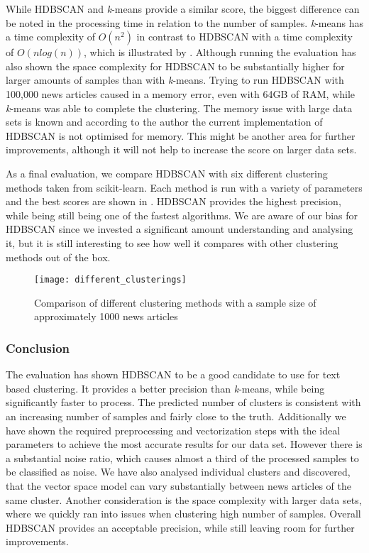 While HDBSCAN and \textit{k}-means provide a similar score,
the biggest difference can be noted in the processing time in relation to the number of samples.
\textit{k}-means has a time complexity of $O(n^2)$ in contrast to HDBSCAN with a time complexity of $O(nlog(n))$,
which is illustrated by .
Although running the evaluation has also shown the space complexity for HDBSCAN
to be substantially higher for larger amounts of samples than with \textit{k}-means.
Trying to run HDBSCAN with 100,000 news articles caused in a memory error,
even with 64GB of RAM, while \textit{k}-means was able to complete the clustering.
The memory issue with large data sets is known and according to the author the current implementation of HDBSCAN
is not optimised for memory\cite{hdbscan_memory_issue}.
This might be another area for further improvements,
although it will not help to increase the score on larger data sets.

As a final evaluation, we compare HDBSCAN with six different clustering methods taken from scikit-learn.
Each method is run with a variety of parameters and the best scores are shown in .
HDBSCAN provides the highest precision, while being still being one of the fastest algorithms.
We are aware of our bias for HDBSCAN since we invested a significant amount understanding and analysing it,
but it is still interesting to see how well it compares with other clustering methods out of the box.

\begin{figure}[h]
    \centering
    \texttt{[image: different\_clusterings]}
    \caption{Comparison of different clustering methods with a sample size of approximately 1000 news articles}
    \label{fig:different_clusterings}
\end{figure}

\subsubsection{Conclusion}
\label{subsubsec:5a_conclusion}

The evaluation has shown HDBSCAN to be a good candidate to use for text based clustering.
It provides a better precision than \textit{k}-means, while being significantly faster to process.
The predicted number of clusters is consistent with an increasing number of samples and fairly close to the truth.
Additionally we have shown the required preprocessing and vectorization steps with the ideal parameters
to achieve the most accurate results for our data set.
However there is a substantial noise ratio,
which causes almost a third of the processed samples to be classified as noise.
We have also analysed individual clusters and discovered,
that the vector space model can vary substantially between news articles of the same cluster.
Another consideration is the space complexity with larger data sets,
where we quickly ran into issues when clustering high number of samples.
Overall HDBSCAN provides an acceptable precision, while still leaving room for further improvements.
